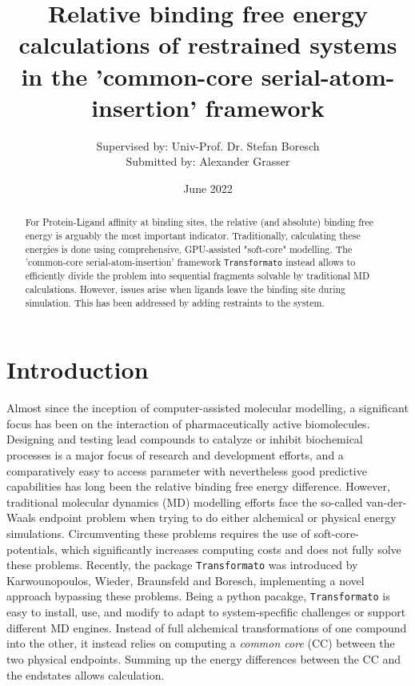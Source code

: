 \documentclass[oneside]{scrreprt}
\title{Relative binding free energy calculations of restrained systems in the 'common-core serial-atom-insertion' framework}
\author{Supervised by: Univ-Prof. Dr. Stefan Boresch\\Submitted by: \hspace{26mm}Alexander Grasser}
\date{June 2022}
\begin{document}
\begin{titlepage}

\maketitle{}
\end{titlepage}
\begin{abstract}
    
    For Protein-Ligand affinity at binding sites, the relative (and absolute) binding free energy is arguably the most important indicator. Traditionally, calculating these energies is done using comprehensive, GPU-assisted "soft-core" modelling. The 'common-core serial-atom-insertion' framework \texttt{Transformato} instead allows to efficiently divide the problem into sequential fragments solvable by traditional MD calculations. However, issues arise when ligands leave the binding site during simulation. This has been addressed by adding restraints to the system.
\end{abstract}

\begingroup
\let\clearpage\relax
\renewcommand\contentsname{Table of Contents}
\tableofcontents
{}
\endgroup
\renewcommand{\thefootnote}{\Roman{footnote}}
\chapter{Introduction}
Almost since the inception of computer-assisted molecular modelling, a significant focus has been on the interaction of pharmaceutically active biomolecules. Designing and testing lead compounds to catalyze or inhibit biochemical processes is a major focus of research and development efforts, and a comparatively easy to access parameter with nevertheless good predictive capabilities has long been the relative binding free energy difference. However, traditional molecular dynamics (MD) modelling efforts face the so-called van-der-Waals endpoint problem when trying to do either alchemical or physical energy simulations. Circumventing these problems requires the use of soft-core-potentials, which significantly increases computing costs and does not fully solve these problems. Recently, the package \texttt{Transformato} was introduced by Karwounopoulos, Wieder, Braunsfeld and Boresch\supercite{Karwou2022Jun,braunsfeldImplementationTestingCHARMM,Wieder2022Jun}, implementing a novel approach bypassing these problems. Being a python pacakge, \texttt{Transformato} is easy to install, use, and modify to adapt to system-specfific challenges or support different MD engines. Instead of full alchemical transformations of one compound into the other, it instead relies on computing a \emph{common core} (CC) between the two physical endpoints. Summing up the energy differences between the CC and the endstates allows calculation. 
\end{document}
